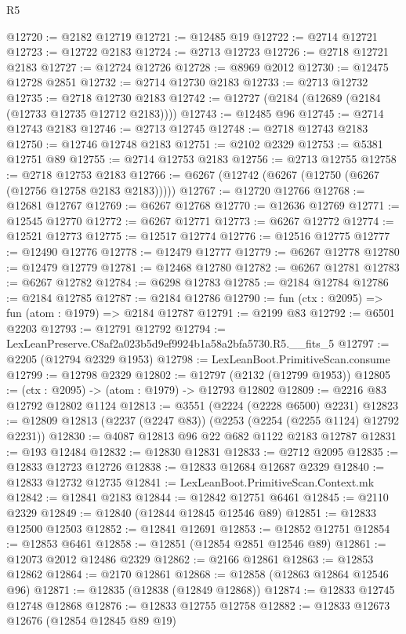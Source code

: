 \begin{lexlean}{R5}
\begin{coremodule}
@12720 := @2182 @12719
@12721 := @12485 @19
@12722 := @2714 @12721
@12723 := @12722 @2183
@12724 := @2713 @12723
@12726 := @2718 @12721 @2183
@12727 := @12724 @12726
@12728 := @8969 @2012
@12730 := @12475 @12728 @2851
@12732 := @2714 @12730 @2183
@12733 := @2713 @12732
@12735 := @2718 @12730 @2183
@12742 := @12727 (@2184 (@12689 (@2184 (@12733 @12735 @12712 @2183))))
@12743 := @12485 @96
@12745 := @2714 @12743 @2183
@12746 := @2713 @12745
@12748 := @2718 @12743 @2183
@12750 := @12746 @12748 @2183
@12751 := @2102 @2329
@12753 := @5381 @12751 @89
@12755 := @2714 @12753 @2183
@12756 := @2713 @12755
@12758 := @2718 @12753 @2183
@12766 := @6267 (@12742 (@6267 (@12750 (@6267 (@12756 @12758 @2183 @2183)))))
@12767 := @12720 @12766
@12768 := @12681 @12767
@12769 := @6267 @12768
@12770 := @12636 @12769
@12771 := @12545 @12770
@12772 := @6267 @12771
@12773 := @6267 @12772
@12774 := @12521 @12773
@12775 := @12517 @12774
@12776 := @12516 @12775
@12777 := @12490 @12776
@12778 := @12479 @12777
@12779 := @6267 @12778
@12780 := @12479 @12779
@12781 := @12468 @12780
@12782 := @6267 @12781
@12783 := @6267 @12782
@12784 := @6298 @12783
@12785 := @2184 @12784
@12786 := @2184 @12785
@12787 := @2184 @12786
@12790 := fun (ctx : @2095) => fun (atom : @1979) => @2184 @12787
@12791 := @2199 @83
@12792 := @6501 @2203
@12793 := @12791 @12792
@12794 := LexLeanPreserve.C8af2a023b5d9ef9924b1a58a2bfa5730.R5.__fits_5
@12797 := @2205 (@12794 @2329 @1953)
@12798 := LexLeanBoot.PrimitiveScan.consume
@12799 := @12798 @2329
@12802 := @12797 (@2132 (@12799 @1953))
@12805 := (ctx : @2095) -> (atom : @1979) -> @12793 @12802
@12809 := @2216 @83 @12792 @12802 @1124
@12813 := @3551 (@2224 (@2228 @6500) @2231)
@12823 := @12809 @12813 (@2237 (@2247 @83)) (@2253 (@2254 (@2255 @1124) @12792 @2231))
@12830 := @4087 @12813 @96 @22 @682 @1122 @2183 @12787
@12831 := @193 @12484
@12832 := @12830 @12831
@12833 := @2712 @2095
@12835 := @12833 @12723 @12726
@12838 := @12833 @12684 @12687 @2329
@12840 := @12833 @12732 @12735
@12841 := LexLeanBoot.PrimitiveScan.Context.mk
@12842 := @12841 @2183
@12844 := @12842 @12751 @6461
@12845 := @2110 @2329
@12849 := @12840 (@12844 @12845 @12546 @89)
@12851 := @12833 @12500 @12503
@12852 := @12841 @12691
@12853 := @12852 @12751
@12854 := @12853 @6461
@12858 := @12851 (@12854 @2851 @12546 @89)
@12861 := @12073 @2012 @12486 @2329
@12862 := @2166 @12861
@12863 := @12853 @12862
@12864 := @2170 @12861
@12868 := @12858 (@12863 @12864 @12546 @96)
@12871 := @12835 (@12838 (@12849 @12868))
@12874 := @12833 @12745 @12748 @12868
@12876 := @12833 @12755 @12758
@12882 := @12833 @12673 @12676 (@12854 @12845 @89 @19)

\end{coremodule}
\end{lexlean}
